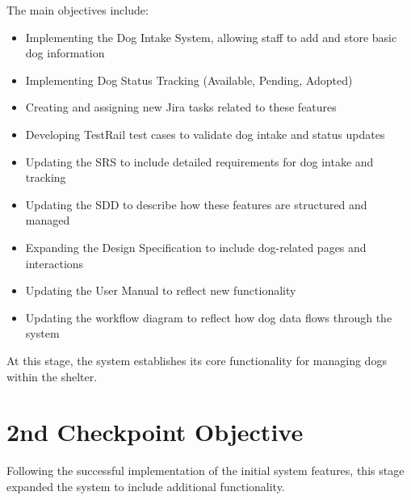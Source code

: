 \documentclass{article}
\begin{document}
The main objectives include:
\begin{itemize}
\item Implementing the Dog Intake System, allowing staff to add and store basic dog information
\item Implementing Dog Status Tracking (Available, Pending, Adopted)
\item Creating and assigning new Jira tasks related to these features
\item Developing TestRail test cases to validate dog intake and status updates
\item Updating the SRS to include detailed requirements for dog intake and tracking
\item Updating the SDD to describe how these features are structured and managed
\item Expanding the Design Specification to include dog-related pages and interactions
\item Updating the User Manual to reflect new functionality
\item Updating the workflow diagram to reflect how dog data flows through the system
\end{itemize}

\vspace{2mm}

\noindent At this stage, the system establishes its core functionality for managing dogs within the shelter.

\vspace{3mm}

\section*{2nd Checkpoint Objective}

Following the successful implementation of the initial system features, this stage expanded the system to include additional functionality.\\
\end{document}
